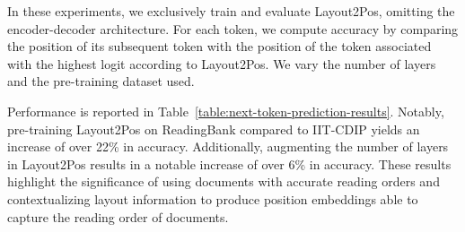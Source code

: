 In these experiments, we exclusively train and evaluate Layout2Pos, omitting the encoder-decoder architecture. For each token, we compute accuracy by comparing the position of its subsequent token with the position of the token associated with the highest logit according to Layout2Pos. We vary the number of layers and the pre-training dataset used. 

Performance is reported in Table~\ref{table:next-token-prediction-results}. Notably, pre-training Layout2Pos on ReadingBank compared to IIT-CDIP yields an increase of over 22\% in accuracy. Additionally, augmenting the number of layers in Layout2Pos results in a notable increase of over 6\% in accuracy. These results highlight the significance of using documents with accurate reading orders and contextualizing layout information to produce position embeddings able to capture the reading order of documents.


